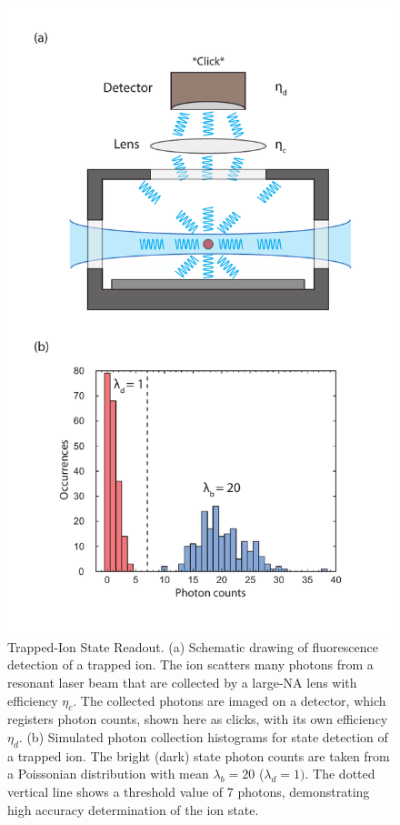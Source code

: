 \documentclass[%
reprint,
 amsmath,amssymb,
]{revtex4-1}
\begin{document}
\begin{figure}
    \centering
    \includegraphics[width=\columnwidth]{Verticalv3.pdf}
    \caption{Trapped-Ion State Readout. (a) Schematic drawing of fluorescence detection of a trapped ion. The ion scatters many photons from a resonant laser beam that are collected by a large-NA lens with efficiency $\eta_{c}$. The collected photons are imaged on a detector, which registers photon counts, shown here as clicks, with its own efficiency $\eta_{d}$. (b) Simulated photon collection histograms for state detection of a trapped ion. The bright (dark) state photon counts are taken from a Poissonian distribution with mean $\lambda_{b}=20$ ($\lambda_{d}=1)$. The dotted vertical line shows a threshold value of 7 photons, demonstrating high accuracy determination of the ion state.}
    \label{fig:detection}
\end{figure}
\end{document}
